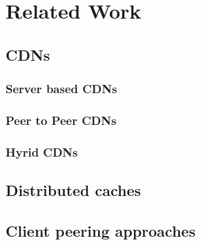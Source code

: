 \chapter{Related Work}\label{ch:related_work}

\section{CDNs}

\subsection{Server based CDNs}
\subsection{Peer to Peer CDNs}
\subsection{Hyrid CDNs}

\section{Distributed caches}

\section{Client peering approaches}
